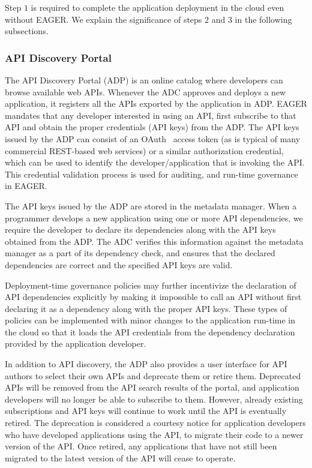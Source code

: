 Step $1$ is required to complete the application deployment in the cloud even
without EAGER. We explain the significance of steps $2$ and $3$ in the 
following subsections.

\subsubsection{API Discovery Portal} 
The API Discovery Portal (ADP) is an online
catalog where developers can browse available web APIs. Whenever the ADC
approves and deploys a new application, it registers all the APIs exported by
the application in ADP.  EAGER mandates that any developer interested in using
an API, first subscribe to that API and obtain the proper credentials (API
keys) from the ADP. The API keys issued by the ADP can consist of an
OAuth~\cite{oauth2}
access
token (as is typical of many commercial REST-based web services) 
or a similar authorization credential, which can be used to identify the
developer/application that is invoking the API. This credential
validation process is used for auditing, and run-time governance in EAGER.

The API keys issued by the ADP are stored in the metadata manager. When a
programmer develops a new application using one or more API dependencies, we
require the developer to declare its dependencies along with the API
keys obtained from the ADP. The ADC verifies this information against
the metadata manager as a part of its dependency check, and ensures that the
declared dependencies are correct and the specified API keys are valid. 

Deployment-time governance policies
may further incentivize the declaration of API 
dependencies explicitly by making it 
impossible to call an API without first declaring it as a dependency along
with the proper API keys. These types of policies can be implemented
with minor changes to the
application run-time in the cloud so that it loads the API credentials from
the dependency declaration provided by the application developer.

In addition to API discovery, the ADP also provides a user
interface for API authors to select their own APIs and deprecate them or
retire them. Deprecated APIs will be removed from the API search
results of the portal, and application developers will no longer be able to 
subscribe to them. However, already existing subscriptions and API keys will continue
to work until the API is eventually retired. 
The deprecation is considered a courtesy notice for application developers
who have developed applications using the API, to migrate their code to a newer version
of the API. 
Once retired, any applications that have
not still been migrated to the latest version of the API will cease to operate.

